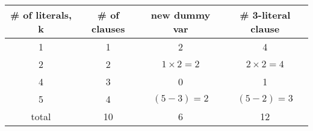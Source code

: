 \documentclass[12pt]{exam}
\begin{document}
\begin{questions}
    \begin{table}[H]
        \centering
        \begin{tabular}{c|c|c|c}
            \# of literals, k & \# of clauses & new dummy var    & \# 3-literal clause \\
            \hline
            1                 & 1             & 2                & 4                   \\
            2                 & 2             & $1 \times 2 = 2$ & $2 \times 2 = 4 $   \\
            4                 & 3             & 0                & 1                   \\
            5                 & 4             & $(5-3) = 2   $   & $ (5-2) = 3 $       \\ \hline
            total             & 10            & 6                & 12
        \end{tabular}
    \end{table}


\end{questions}
\end{document}
